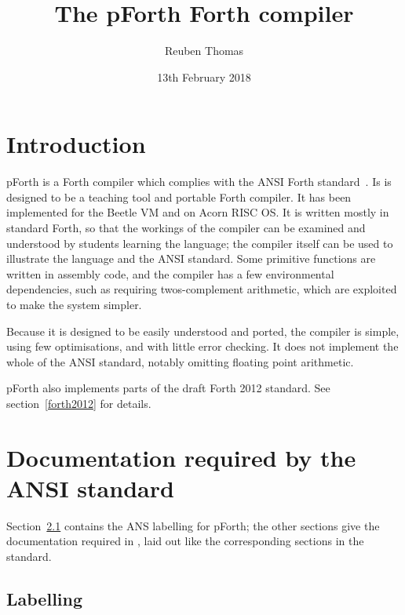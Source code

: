 \documentclass[english]{article}
\begin{document}
\title{The pForth Forth compiler}
\author{Reuben Thomas}
\date{13th February 2018}
\maketitle


\section{Introduction}

pForth is a Forth compiler which complies with the ANSI Forth standard~\cite{ANSIforth}. Is is designed to be a teaching tool and portable Forth compiler. It has been implemented for the Beetle VM and on Acorn RISC OS. It is written mostly in standard Forth, so that the workings of the compiler can be examined and understood by students learning the language; the compiler itself can be used to illustrate the language and the ANSI standard. Some primitive functions are written in assembly code, and the compiler has a few environmental dependencies, such as requiring twos-complement arithmetic, which are exploited to make the system simpler.

Because it is designed to be easily understood and ported, the compiler is
simple, using few optimisations, and with little error checking. It does not
implement the whole of the ANSI standard, notably omitting floating point arithmetic.

pForth also implements parts of the draft Forth 2012 standard. See section~\ref{forth2012} for details.


\section{Documentation required by the ANSI standard}

Section~\ref{labelling} contains the ANS labelling for pForth; the other
sections give the documentation required in \cite[section 4.1]{ANSIforth},
laid out like the corresponding sections in the standard.


\subsection{Labelling}
\label{labelling}
\end{document}

